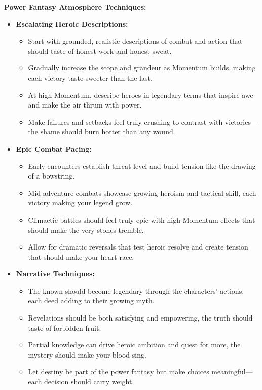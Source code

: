 \documentclass[11pt]{article}
\begin{document}
\textbf{Power Fantasy Atmosphere Techniques:}
\begin{itemize}
\item \textbf{Escalating Heroic Descriptions:}
  \begin{itemize}
  \item Start with grounded, realistic descriptions of combat and action that should taste of honest work and honest sweat.
  \item Gradually increase the scope and grandeur as Momentum builds, making each victory taste sweeter than the last.
  \item At high Momentum, describe heroes in legendary terms that inspire awe and make the air thrum with power.
  \item Make failures and setbacks feel truly crushing to contrast with victories—the shame should burn hotter than any wound.
  \end{itemize}
\item \textbf{Epic Combat Pacing:}
  \begin{itemize}
  \item Early encounters establish threat level and build tension like the drawing of a bowstring.
  \item Mid-adventure combats showcase growing heroism and tactical skill, each victory making your legend grow.
  \item Climactic battles should feel truly epic with high Momentum effects that should make the very stones tremble.
  \item Allow for dramatic reversals that test heroic resolve and create tension that should make your heart race.
  \end{itemize}
\item \textbf{Narrative Techniques:}
  \begin{itemize}
  \item The known should become legendary through the characters' actions, each deed adding to their growing myth.
  \item Revelations should be both satisfying and empowering, the truth should taste of forbidden fruit.
  \item Partial knowledge can drive heroic ambition and quest for more, the mystery should make your blood sing.
  \item Let destiny be part of the power fantasy but make choices meaningful—each decision should carry weight.
  \end{itemize}
\end{itemize}
\end{document}
